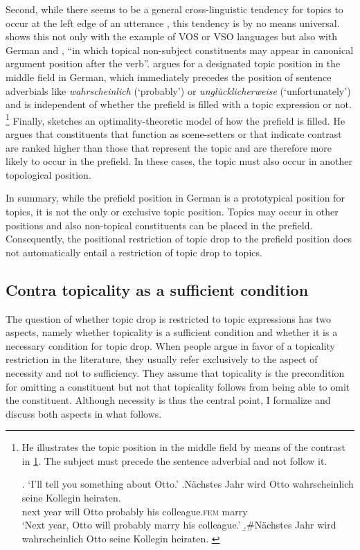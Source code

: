 Second, while there seems to be a general cross\hyp linguistic tendency for topics to occur at the left edge of an utterance \citep[e.g.,][471]{gundel2010.topic}, this tendency is by no means universal.
\citet[200]{lambrecht1994} shows this not only with the example of VOS or VSO languages but also with German and , ``in which topical non-subject constituents may appear in canonical argument  position after the verb''.
\citet[140; 145]{frey2000} argues for a designated topic position in the middle field  in German, which immediately precedes the position of sentence adverbials  like \textit{wahrscheinlich} (`probably') or \textit{unglücklicherweise} (`unfortunately') and is independent of whether the prefield is filled with a topic expression or not.%
\footnote{He illustrates the topic position in the middle field  by means of the contrast in \ref{ex:frey}.
The subject must precede the sentence adverbial  and not follow it.

\ex.\label{ex:frey}
`I'll tell you something about Otto.'
\ag.Nächstes Jahr wird Otto wahrscheinlich seine Kollegin heiraten.\\
next year will Otto probably his colleague.\textsc{fem} marry\\
`Next year, Otto will probably marry his colleague.'
\b.\#Nächstes Jahr wird  wahrscheinlich Otto seine Kollegin heiraten. \citep[141, his judgments]{frey2000}
\vspace{-1em}
}
Finally, \citet{speyer2010} sketches an optimality-theoretic  model of how the prefield is filled.
He argues that constituents that function as scene-setters or that indicate contrast are ranked higher than those that represent the topic and are therefore more likely to occur in the prefield.
In these cases, the topic must also occur in another topological position.

In summary, while the prefield position in German is a prototypical position for topics, it is not the only or exclusive topic position.
Topics may occur in other positions and also non-topical constituents can be placed in the prefield.
Consequently, the positional restriction of topic drop to the prefield position does not automatically entail a restriction of topic drop to topics.

\subsection{Contra topicality as a sufficient condition}\label{sec:topicality.suff}
The question of whether topic drop is restricted to topic expressions has two aspects, namely whether topicality is a sufficient condition and whether it is a necessary condition for topic drop.
When people argue in favor of a topicality restriction in the literature, they usually refer exclusively to the aspect of necessity and not to sufficiency. 
They assume that topicality is the precondition for omitting a constituent but not that topicality follows from being able to omit the constituent.
Although necessity is thus the central point, I formalize and discuss both aspects in what follows.

